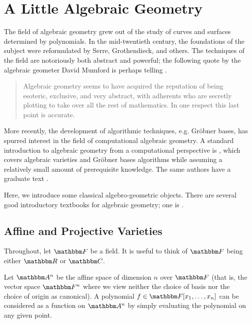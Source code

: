 \documentclass[11pt,titlepage]{article}
\numberwithin{equation}{section}
\begin{document}
\appendix

\section{A Little Algebraic Geometry}

    The field of algebraic geometry grew out of the study of curves and surfaces
    determined by polynomials.  In the mid-twentieth century, the foundations of
    the subject were reformulated by Serre, Grothendieck, and others.  The
    techniques of the field are notoriously both abstract and powerful; the
    following quote by the algebraic geometer David Mumford is perhaps telling
    \cite{Mum99}.
    \begin{quote}
        Algebraic geometry seems to have acquired the reputation of being
        esoteric, exclusive, and very abstract, with adherents who are secretly
        plotting to take over all the rest of mathematics.  In one respect this
        last point is accurate.
    \end{quote}
    More recently, the development of algorithmic techniques, e.g. Gröbner
    bases, has spurred interest in the field of computational algebraic
    geometry.  A standard introduction to algebraic geometry from a
    computational perspective is \cite{CLO97}, which covers algebraic varieties
    and Gröbner bases algorithms while assuming a relatively small amount of
    prerequisite knowledge.  The same authors have a graduate text \cite{CLO05}.

    Here, we introduce some classical algebro-geometric objects.  There are
    several good introductory textbooks for algebraic geometry; one is
    \cite{Sha94}.

\subsection{Affine and Projective Varieties}
    \label{sec:varieties}
    Throughout, let $\F$ be a field.  It is useful to think of $\F$ being either
    $\R$ or $\C$.

    Let $\A^n$ be the affine space of dimension $n$ over $\F$ (that is, the
    vector space $\F^n$ where we view neither the choice of basis nor the choice
    of origin as canonical).  A polynomial $f \in \F[x_1, \ldots, x_n]$ can be
    considered as a function on $\A^n$ by simply evaluating the polynomial on
    any given point.
\end{document}
